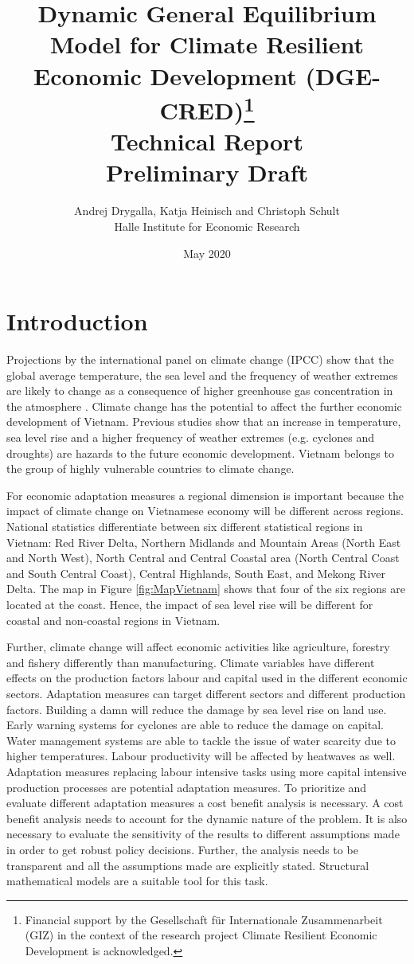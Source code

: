 \documentclass[10pt,a4paper]{article}
\title{Dynamic General Equilibrium Model for Climate Resilient Economic Development (DGE-CRED)\thanks{Financial support by the Gesellschaft für Internationale Zusammenarbeit (GIZ) in the context of the research project Climate Resilient Economic Development is acknowledged.}\\
\hspace{1cm}
\large{Technical Report} \\
\hspace{1cm}
\large{Preliminary Draft}}
\date{May 2020}
\author{Andrej Drygalla, Katja Heinisch and Christoph Schult \\ Halle Institute for Economic Research}
\begin{document}
\maketitle

\section{Introduction}

Projections by the international panel on climate change (IPCC) show that the global average temperature, the sea level and the frequency of weather extremes are likely to change as a consequence of higher greenhouse gas concentration in the atmosphere \cite{stocker2013climate}. Climate change has the potential to affect the further economic development of Vietnam. Previous studies \citep[e.g.][]{arndt2015economic,wassmann2004sea,chen2012climate} show that an increase in temperature, sea level rise and a higher frequency of weather extremes (e.g. cyclones and droughts) are hazards to the future economic development. Vietnam belongs to the group of highly vulnerable countries to climate change.

For economic adaptation measures a regional dimension is important because the impact of climate change on Vietnamese economy will be different across regions. National statistics differentiate between six different statistical regions in Vietnam: Red River Delta, Northern Midlands and Mountain Areas (North East and North West), North Central and Central Coastal area (North Central Coast and South Central Coast), Central Highlands, South East, and Mekong River Delta. The map in Figure \ref{fig:MapVietnam} shows that four of the six regions are located at the coast. Hence, the impact of sea level rise will be different for coastal and non-coastal regions in Vietnam. 

Further, climate change will affect economic activities like agriculture, forestry and fishery differently than manufacturing. Climate variables have different effects on the production factors labour and capital used in the different economic sectors. Adaptation measures can target different sectors and different production factors. Building a damn will reduce the damage by sea level rise on land use. Early warning systems for cyclones are able to reduce the damage on capital. Water management systems are able to tackle the issue of water scarcity due to higher temperatures. Labour productivity will be affected by heatwaves as well. Adaptation measures replacing labour intensive tasks using more capital intensive production processes are potential adaptation measures. To prioritize and evaluate different adaptation measures a cost benefit analysis is necessary. A cost benefit analysis needs to account for the dynamic nature of the problem. It is also necessary to evaluate the sensitivity of the results to different assumptions made in order to get robust policy decisions. Further, the analysis needs to be transparent and all the assumptions made are explicitly stated. Structural mathematical models are a suitable tool for this task. 
\end{document}
